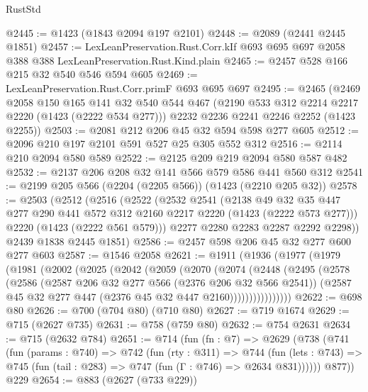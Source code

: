 \begin{lexlean}{RustStd}
\begin{coremodule}
{\begin{coremodule}
{{{{{{{{@2445 := @1423 (@1843 @2094 @197 @2101)
@2448 := @2089 (@2441 @2445 @1851)
@2457 := LexLeanPreservation.Rust.Corr.kIf
    @693
    @695
    @697
    @2058
    @388
    @388
    LexLeanPreservation.Rust.Kind.plain
@2465 := @2457 @528 @166 @215 @32 @540 @546 @594 @605
@2469 := LexLeanPreservation.Rust.Corr.primF @693 @695 @697
@2495 := @2465
    (@2469
      @2058
      @150
      @165
      @141
      @32
      @540
      @544
      @467
      (@2190 @533 @312 @2214 @2217 @2220 (@1423 (@2222 @534 @277)))
      @2232
      @2236
      @2241
      @2246
      @2252
      (@1423 @2255))
@2503 := @2081 @212 @206 @45 @32 @594 @598 @277 @605
@2512 := @2096 @210 @197 @2101 @591 @527 @25 @305 @552 @312
@2516 := @2114 @210 @2094 @580 @589
@2522 := @2125 @209 @219 @2094 @580 @587 @482
@2532 := @2137 @206 @208 @32 @141 @566 @579 @586 @441 @560 @312
@2541 := @2199 @205 @566 (@2204 (@2205 @566)) (@1423 (@2210 @205 @32))
@2578 := @2503
    (@2512
      (@2516
        (@2522
          (@2532
            @2541
            (@2138
              @49
              @32
              @35
              @447
              @277
              @290
              @441
              @572
              @312
              @2160
              @2217
              @2220
              (@1423 (@2222 @573 @277)))
            @2220
            (@1423 (@2222 @561 @579)))
          @2277
          @2280
          @2283
          @2287
          @2292
          @2298))
      @2439
      @1838
      @2445
      @1851)
@2586 := @2457 @598 @206 @45 @32 @277 @600 @277 @603
@2587 := @1546 @2058
@2621 := @1911
    (@1936
      (@1977
        (@1979
          (@1981
            (@2002
              (@2025
                (@2042
                  (@2059
                    (@2070
                      (@2074
                        (@2448
                          (@2495
                            (@2578
                              (@2586
                                (@2587 @206 @32 @277 @566 (@2376 @206 @32 @566 @2541))
                                (@2587 @45 @32 @277 @447 (@2376 @45 @32 @447 @2160))))))))))))))))
@2622 := @698 @80
@2626 := @700 (@704 @80) (@710 @80)
@2627 := @719 @1674
@2629 := @715 (@2627 @735)
@2631 := @758 (@759 @80)
@2632 := @754 @2631
@2634 := @715 (@2632 @784)
@2651 := @714
    (fun (fn : @7) =>
    @2629
      (@738
        (@741
          (fun (params : @740) =>
          @742
            (fun (rty : @311) =>
            @744
              (fun (lets : @743) =>
              @745 (fun (tail : @283) => @747 (fun (Γ : @746) => @2634 @831))))))
        @877))
    @229
@2654 := @883 (@2627 (@733 @229))
}}}}}}}}
\end{coremodule}}
\end{coremodule}
\end{lexlean}

